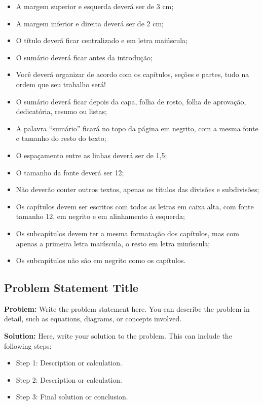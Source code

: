 \begin{itemize}
    \item A margem superior e esquerda deverá ser de 3 cm;
    \item A margem inferior e direita deverá ser de 2 cm;
    \item O título deverá ficar centralizado e em letra maiúscula;
    \item O sumário deverá ficar antes da introdução;
    \item Você deverá organizar de acordo com os capítulos, seções e partes, tudo na ordem que seu trabalho será!
    \item O sumário deverá ficar depois da capa, folha de rosto, folha de aprovação, dedicatória, resumo ou listas;
    \item A palavra “sumário” ficará no topo da página em negrito, com a mesma fonte e tamanho do resto do texto;
    \item O espaçamento entre as linhas deverá ser de 1,5;
    \item O tamanho da fonte deverá ser 12;
    \item Não deverão conter outros textos, apenas os títulos das divisões e subdivisões;
    \item Os capítulos devem ser escritos com todas as letras em caixa alta, com fonte tamanho 12, em negrito e em alinhamento à esquerda;
    \item Os subcapítulos devem ter a mesma formatação dos capítulos, mas com apenas a primeira letra maiúscula, o resto em letra minúscula;
    \item Os subcapítulos não são em negrito como os capítulos.
\end{itemize}


\subsection{Problem Statement Title}
\textbf{Problem:} Write the problem statement here. You can describe the problem in detail, such as equations, diagrams, or concepts involved.

\vspace{1em} %

\textbf{Solution:} Here, write your solution to the problem. This can include the following steps:
\begin{itemize}
    \item Step 1: Description or calculation.
    \item Step 2: Description or calculation.
    \item Step 3: Final solution or conclusion.
\end{itemize}

